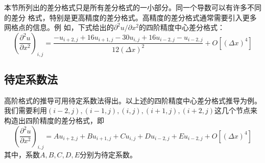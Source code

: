 本节所列出的差分格式只是所有差分格式的一小部分。同一个导数可以有许多不同的差分
格式，特别是更高精度的差分格式。高精度的差分格式通常需要引入更多网格点的信息。例
如，下式给出的$\partial^{2} u/\partial x^{2}$的四阶精度中心差分格式：
\begin{equation}
  \left(
    \frac{\partial^{2} u}{\partial x^{2}}
  \right)_{i,j}
  =
  \frac{-u_{i+2,j}+16u_{i+1,j}-30u_{i,j}+16u_{i-2,j}-u_{i-2,j}}{12(\Delta x)^{2}}
  +
  O[(\Delta x)^{4}]
\end{equation}

\subsection{待定系数法}
高阶格式的推导可用待定系数法得出。以上述的四阶精度中心差分格式推导为例。
我们需要利用$(i-2,j), (i-1,j), (i,j), (i+1,j),
(i+2,j)$这几个节点来构造出四阶精度的差分格式，即
\begin{equation}
  \left(
    \frac{\partial^{2} u}{\partial x^{2}}
  \right)_{i,j}
  =
  Au_{i+2,j}+Bu_{i+1,j}+Cu_{i,j}+Du_{i-2,j}+Eu_{i-2,j}
  +
  O[(\Delta x)^{4}]
\end{equation}
其中，系数$A, B, C, D, E$分别为待定系数。

